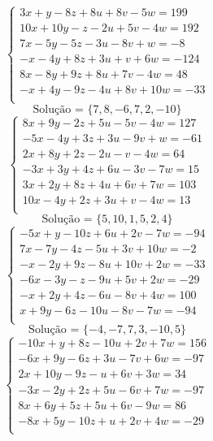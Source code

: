 \documentclass[12pt,oneside,a4paper]{article}
\begin{document}
\vspace{\baselineskip}
\begin{equation*}
\begin{cases}
3x+y-8z+8u+8v-5w=199 \\
10x+10y-z-2u+5v-4w=192 \\
7x-5y-5z-3u-8v+w=-8 \\
-x-4y+8z+3u+v+6w=-124 \\
8x-8y+9z+8u+7v-4w=48 \\
-x+4y-9z-4u+8v+10w=-33 \\
\end{cases}
\end{equation*}
\begin{equation*}
\text{Solução = }\{7,8,-6,7,2,-10\}
\end{equation*}
\vspace{\baselineskip}
\begin{equation*}
\begin{cases}
8x+9y-2z+5u-5v-4w=127 \\
-5x-4y+3z+3u-9v+w=-61 \\
2x+8y+2z-2u-v-4w=64 \\
-3x+3y+4z+6u-3v-7w=15 \\
3x+2y+8z+4u+6v+7w=103 \\
10x-4y+2z+3u+v-4w=13 \\
\end{cases}
\end{equation*}
\begin{equation*}
\text{Solução = }\{5,10,1,5,2,4\}
\end{equation*}
\vspace{\baselineskip}
\begin{equation*}
\begin{cases}
-5x+y-10z+6u+2v-7w=-94 \\
7x-7y-4z-5u+3v+10w=-2 \\
-x-2y+9z-8u+10v+2w=-33 \\
-6x-3y-z-9u+5v+2w=-29 \\
-x+2y+4z-6u-8v+4w=100 \\
x+9y-6z-10u-8v-7w=-94 \\
\end{cases}
\end{equation*}
\begin{equation*}
\text{Solução = }\{-4,-7,7,3,-10,5\}
\end{equation*}
\vspace{\baselineskip}
\begin{equation*}
\begin{cases}
-10x+y+8z-10u+2v+7w=156 \\
-6x+9y-6z+3u-7v+6w=-97 \\
2x+10y-9z-u+6v+3w=34 \\
-3x-2y+2z+5u-6v+7w=-97 \\
8x+6y+5z+5u+6v-9w=86 \\
-8x+5y-10z+u+2v+4w=-29 \\
\end{cases}
\end{equation*}
\end{document}

